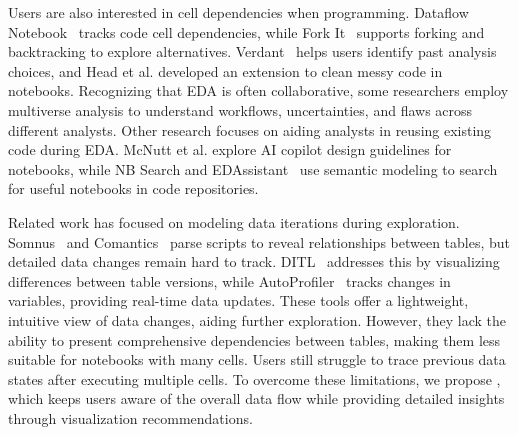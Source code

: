 Users are also interested in cell dependencies when programming. Dataflow Notebook~\cite{dataflow} tracks code cell dependencies, while Fork It~\cite{forkit} supports forking and backtracking to explore alternatives. Verdant~\cite{verdant} helps users identify past analysis choices, and Head et al.\cite{messnotebook} developed an extension to clean messy code in notebooks. Recognizing that EDA is often collaborative, some researchers employ multiverse analysis\cite{multiverse, multiverseworkflow} to understand workflows, uncertainties, and flaws across different analysts. Other research focuses on aiding analysts in reusing existing code during EDA. McNutt et al.\cite{notebookaidesign} explore AI copilot design guidelines for notebooks, while NB Search\cite{nbsearch} and EDAssistant~\cite{edassistant} use semantic modeling to search for useful notebooks in code repositories.

Related work has focused on modeling data iterations during exploration. Somnus~\cite{somnus} and Comantics~\cite{comantics} parse scripts to reveal relationships between tables, but detailed data changes remain hard to track. DITL~\cite{ditl} addresses this by visualizing differences between table versions, while AutoProfiler~\cite{autoprofiler} tracks changes in variables, providing real-time data updates. These tools offer a lightweight, intuitive view of data changes, aiding further exploration. However, they lack the ability to present comprehensive dependencies between tables, making them less suitable for notebooks with many cells. Users still struggle to trace previous data states after executing multiple cells. To overcome these limitations, we propose \system{}, which keeps users aware of the overall data flow while providing detailed insights through visualization recommendations.